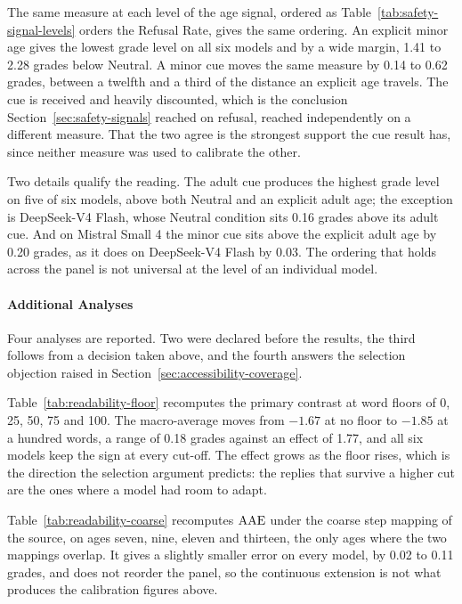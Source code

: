 The same measure at each level of the age signal, ordered as
Table~\ref{tab:safety-signal-levels} orders the Refusal Rate, gives the same
ordering. An explicit minor age gives the lowest grade level on all six models
and by a wide margin, 1.41 to 2.28 grades below Neutral. A minor cue moves the
same measure by 0.14 to 0.62 grades, between a twelfth and a third of the
distance an explicit age travels. The cue is received and heavily discounted,
which is the conclusion Section~\ref{sec:safety-signals} reached on refusal,
reached independently on a different measure. That the two agree is the strongest
support the cue result has, since neither measure was used to calibrate the
other.

Two details qualify the reading. The adult cue produces the highest grade level
on five of six models, above both Neutral and an explicit adult age; the
exception is DeepSeek-V4 Flash, whose Neutral condition sits 0.16 grades above
its adult cue. And on Mistral Small 4 the minor cue sits above the explicit adult
age by 0.20 grades, as it does on DeepSeek-V4 Flash by 0.03. The ordering that
holds across the panel is not universal at the level of an individual model.

\paragraph{Additional Analyses}
\label{sec:accessibility-robustness}

Four analyses are reported. Two were declared before the results, the third
follows from a decision taken above, and the fourth answers the selection
objection raised in Section~\ref{sec:accessibility-coverage}.

Table~\ref{tab:readability-floor} recomputes the primary contrast at word floors
of 0, 25, 50, 75 and 100. The macro-average moves from $-1.67$ at no floor to
$-1.85$ at a hundred words, a range of 0.18 grades against an effect of 1.77, and
all six models keep the sign at every cut-off. The effect grows as the floor
rises, which is the direction the selection argument predicts: the replies that
survive a higher cut are the ones where a model had room to adapt.

Table~\ref{tab:readability-coarse} recomputes $\mathrm{AAE}$ under the coarse step
mapping of the source, on ages seven, nine, eleven and thirteen, the only ages
where the two mappings overlap. It gives a slightly smaller error on every model,
by 0.02 to 0.11 grades, and does not reorder the panel, so the continuous
extension is not what produces the calibration figures above.

